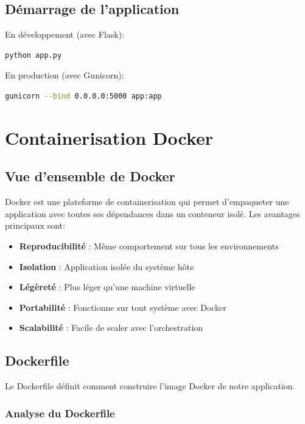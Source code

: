 \documentclass[12pt,a4paper,twoside]{report}
\begin{document}
\section{Démarrage de l'application}

En développement (avec Flask):
\begin{lstlisting}[language=bash]
python app.py
\end{lstlisting}

En production (avec Gunicorn):
\begin{lstlisting}[language=bash]
gunicorn --bind 0.0.0.0:5000 app:app
\end{lstlisting}

\newpage

\chapter{Containerisation Docker}

\section{Vue d'ensemble de Docker}

Docker est une plateforme de containerisation qui permet d'empaqueter une application avec toutes ses dépendances dans un conteneur isolé. Les avantages principaux sont:

\begin{itemize}
    \item \textbf{Reproducibilité} : Même comportement sur tous les environnements
    \item \textbf{Isolation} : Application isolée du système hôte
    \item \textbf{Légèreté} : Plus léger qu'une machine virtuelle
    \item \textbf{Portabilité} : Fonctionne sur tout système avec Docker
    \item \textbf{Scalabilité} : Facile de scaler avec l'orchestration
\end{itemize}

\section{Dockerfile}

Le Dockerfile définit comment construire l'image Docker de notre application.

\subsection{Analyse du Dockerfile}
\end{document}
